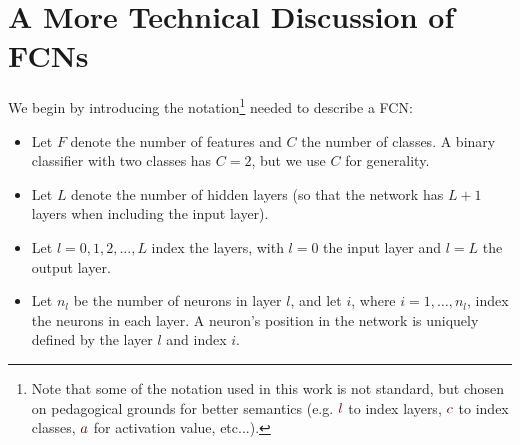 \documentclass[11pt, a4paper]{article}
\newcommand{\myhref}[2]{\hyperref[#1]{\textcolor{blue}{#2}}}
\begin{document}
\newpage
\appendix
\section{A More Technical Discussion of FCNs} \label{s:appendix-fcn}
We begin by introducing the notation\footnote{Note that some of the notation used in this work is not standard, but chosen on pedagogical grounds for better semantics (e.g. $ {\color{myMaroon} l} $ to index {\color{myMaroon} l}ayers, $ {\color{myMaroon} c} $ to index {\color{myMaroon} c}lasses, $ {\color{myMaroon} a} $ for {\color{myMaroon} a}ctivation value, etc...).} needed to describe a FCN:
\begin{itemize}

    \item Let $ F $ denote the number of features and $ C $ the number of classes. A binary classifier with two classes has $ C = 2 $, but we use $ C $ for generality.

    \item Let $ L $ denote the number of hidden layers (so that the network has $ L + 1 $ layers when including the input layer).

    \item Let $ l = 0, 1, 2, ..., L $ index the layers, with $ l = 0 $ the input layer and $ l = L $ the output layer.

    \item Let $ n_{l} $ be the number of neurons in layer $ l $, and let $ i $, where $ i = 1, \ldots, n_{l} $, index the neurons in each layer. A neuron's position in the network is uniquely defined by the layer $ l $ and index $ i $.


\end{itemize}
\end{document}
